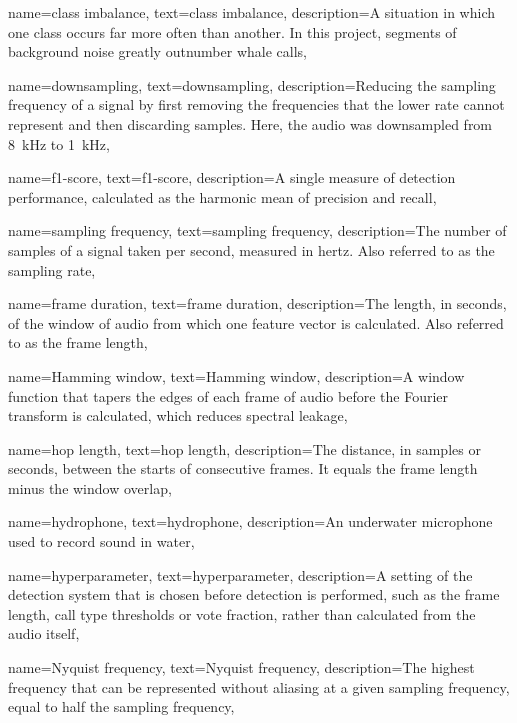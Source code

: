 {
	name=class imbalance,
	text=class imbalance,
	description={A situation in which one class occurs far more often than another. In this project, segments of background noise greatly outnumber whale calls},
}

{
	name=downsampling,
	text=downsampling,
	description={Reducing the sampling frequency of a signal by first removing the frequencies that the lower rate cannot represent and then discarding samples. Here, the audio was downsampled from 8~kHz to 1~kHz},
}

{
	name=f1-score,
	text=f1-score,
	description={A single measure of detection performance, calculated as the harmonic mean of precision and recall},
}

{
	name=sampling frequency,
	text=sampling frequency,
	description={The number of samples of a signal taken per second, measured in hertz. Also referred to as the sampling rate},
}

{
	name=frame duration,
	text=frame duration,
	description={The length, in seconds, of the window of audio from which one feature vector is calculated. Also referred to as the frame length},
}

{
	name=Hamming window,
	text=Hamming window,
	description={A window function that tapers the edges of each frame of audio before the Fourier transform is calculated, which reduces spectral leakage},
}

{
	name=hop length,
	text=hop length,
	description={The distance, in samples or seconds, between the starts of consecutive frames. It equals the frame length minus the window overlap},
}

{
	name=hydrophone,
	text=hydrophone,
	description={An underwater microphone used to record sound in water},
}

{
	name=hyperparameter,
	text=hyperparameter,
	description={A setting of the detection system that is chosen before detection is performed, such as the frame length, call type thresholds or vote fraction, rather than calculated from the audio itself},
}

{
	name=Nyquist frequency,
	text=Nyquist frequency,
	description={The highest frequency that can be represented without aliasing at a given sampling frequency, equal to half the sampling frequency},
}

